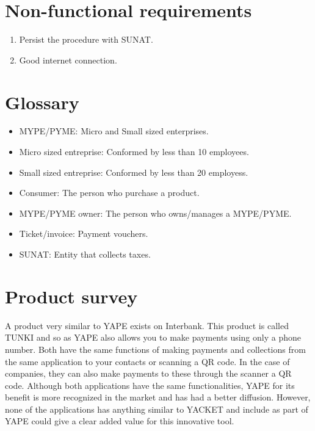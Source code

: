 \documentclass{article}
\begin{document}
\section{Non-functional requirements}
\begin{enumerate}
     \item Persist the procedure with SUNAT.
     \item Good internet connection.
    
\end{enumerate}

\section{Glossary}

\begin{itemize}
    \item MYPE/PYME: Micro and Small sized enterprises.
    \item Micro sized entreprise: Conformed by less than 10 employees.
    \item Small sized entreprise: Conformed by less than 20 employess.
    \item Consumer: The person who purchase a product.
    \item MYPE/PYME owner: The person who owns/manages a MYPE/PYME.
    \item Ticket/invoice: Payment vouchers.
    \item SUNAT: Entity that collects taxes.
\end{itemize}


\section{Product survey}
A product very similar to YAPE exists on Interbank. This product is called TUNKI and so as YAPE also allows you to make payments using only a phone number.
Both have the same functions of making payments and collections from the
same application to your contacts or scanning a QR code. In the case of
companies, they can also make payments to these through the scanner a
QR code. Although both applications have the same functionalities,
YAPE for its benefit is more recognized in the market and has had a better
diffusion. However, none of the applications has anything similar to
YACKET and include as part of YAPE could give a clear added value
for this innovative tool.
\end{document}
